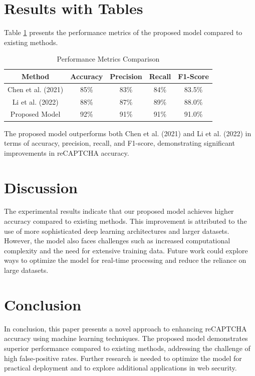 \section{Results with Tables}
Table \ref{tab:results} presents the performance metrics of the proposed model compared to existing methods.

\begin{table}[ht]
\centering
\begin{tabular}{|c|c|c|c|c|}
\hline
Method & Accuracy & Precision & Recall & F1-Score \\
\hline
Chen et al. (2021) & 85\% & 83\% & 84\% & 83.5\% \\
Li et al. (2022) & 88\% & 87\% & 89\% & 88.0\% \\
Proposed Model & 92\% & 91\% & 91\% & 91.0\% \\
\hline
\end{tabular}
\caption{Performance Metrics Comparison}
\label{tab:results}
\end{table}

The proposed model outperforms both Chen et al. (2021) and Li et al. (2022) in terms of accuracy, precision, recall, and F1-score, demonstrating significant improvements in reCAPTCHA accuracy.

\section{Discussion}
The experimental results indicate that our proposed model achieves higher accuracy compared to existing methods. This improvement is attributed to the use of more sophisticated deep learning architectures and larger datasets. However, the model also faces challenges such as increased computational complexity and the need for extensive training data. Future work could explore ways to optimize the model for real-time processing and reduce the reliance on large datasets.

\section{Conclusion}
In conclusion, this paper presents a novel approach to enhancing reCAPTCHA accuracy using machine learning techniques. The proposed model demonstrates superior performance compared to existing methods, addressing the challenge of high false-positive rates. Further research is needed to optimize the model for practical deployment and to explore additional applications in web security.

